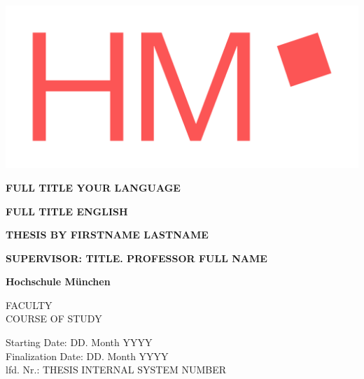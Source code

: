\documentclass[../Main/main.tex]{subfiles}
\begin{document}
\begin{center}
	\vspace{1cm}

	\includegraphics[width=\textwidth]{../media/HM_Logo_RGB.png}

	\vspace{0.8cm}
	\textbf{FULL TITLE YOUR LANGUAGE}

	\vspace{0.8cm}
	\textbf{FULL TITLE ENGLISH}

	\vspace{0.8cm}
	\textbf{THESIS BY FIRSTNAME LASTNAME}

    \vspace{0.8cm}
    \textbf{SUPERVISOR: TITLE. PROFESSOR FULL NAME}

	\vfill
	\textbf{Hochschule München}

	FACULTY\\
	COURSE OF STUDY
	\vspace{1.5cm}

	Starting Date: DD. Month YYYY\\
	Finalization Date: DD. Month YYYY\\
	lfd. Nr.: THESIS INTERNAL SYSTEM NUMBER\\
\end{center}

\clearpage
\end{document}
